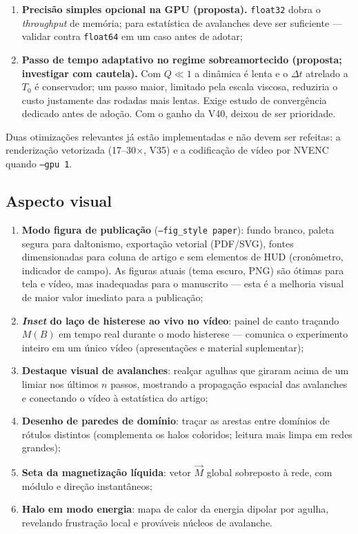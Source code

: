 \documentclass[11pt,a4paper]{article}
\newcommand{\code}[1]{\texttt{#1}}
\begin{document}
\begin{enumerate}
\emph{Validação}: execução paralela com 4 \emph{workers} produz CSVs
bit-idênticos aos da execução serial; retomada total (``nada a fazer'')
e parcial (interrupção simulada) funcionam; o script de análise lê o
\emph{manifest} da V02 sem alteração. O ganho de tempo é $\sim$linear no
número de núcleos --- não mensurável no ambiente de desenvolvimento
(1 núcleo), a confirmar no servidor;
\item \textbf{Precisão simples opcional na GPU (proposta).}
\code{float32} dobra o \emph{throughput} de memória; para estatística de
avalanches deve ser suficiente --- validar contra \code{float64} em um
caso antes de adotar;
\item \textbf{Passo de tempo adaptativo no regime sobreamortecido
(proposta; investigar com cautela).} Com $Q \ll 1$ a dinâmica é lenta e
o $\Delta t$ atrelado a $T_0$ é conservador; um passo maior, limitado
pela escala viscosa, reduziria o custo justamente das rodadas mais
lentas. Exige estudo de convergência dedicado antes de adoção. Com o
ganho da V40, deixou de ser prioridade.
\end{enumerate}

Duas otimizações relevantes já estão implementadas e não devem ser
refeitas: a renderização vetorizada (17--30$\times$, V35) e a
codificação de vídeo por NVENC quando \code{--gpu 1}.

\subsection{Aspecto visual}

\begin{enumerate}
\item \textbf{Modo figura de publicação} (\code{--fig\_style paper}):
fundo branco, paleta segura para daltonismo, exportação vetorial
(PDF/SVG), fontes dimensionadas para coluna de artigo e sem elementos de
HUD (cronômetro, indicador de campo). As figuras atuais (tema escuro,
PNG) são ótimas para tela e vídeo, mas inadequadas para o manuscrito ---
esta é a melhoria visual de maior valor imediato para a publicação;
\item \textbf{\emph{Inset} do laço de histerese ao vivo no vídeo}:
painel de canto traçando $M(B)$ em tempo real durante o modo histerese
--- comunica o experimento inteiro em um único vídeo (apresentações e
material suplementar);
\item \textbf{Destaque visual de avalanches}: realçar agulhas que
giraram acima de um limiar nos últimos $n$ passos, mostrando a
propagação espacial das avalanches e conectando o vídeo à estatística
do artigo;
\item \textbf{Desenho de paredes de domínio}: traçar as arestas entre
domínios de rótulos distintos (complementa os halos coloridos; leitura
mais limpa em redes grandes);
\item \textbf{Seta da magnetização líquida}: vetor $\vec M$ global
sobreposto à rede, com módulo e direção instantâneos;
\item \textbf{Halo em modo energia}: mapa de calor da energia dipolar
por agulha, revelando frustração local e prováveis núcleos de
avalanche.
\end{enumerate}
\end{document}
